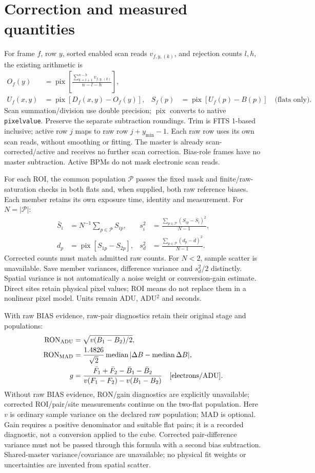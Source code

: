 \documentclass[10pt,a4paper]{article}
\begin{document}
\section*{Correction and measured quantities}
For frame $f$, row $y$, sorted enabled scan reads $v_{f,y,(k)}$, and rejection
counts $l,h$, the existing arithmetic is
\begin{align}
O_f(y)&=\operatorname{pix}\left[\frac{\sum_{k=l+1}^{n-h}v_{f,y,(k)}}{n-l-h}\right],\\
U_f(x,y)&=\operatorname{pix}[D_f(x,y)-O_f(y)], &
S_f(p)&=\operatorname{pix}[U_f(p)-B(p)]\quad\text{(flats only)}.
\end{align}
Scan summation/division use double precision; $\operatorname{pix}$ converts to
native \texttt{pixelvalue}. Preserve the separate subtraction roundings. Trim is
FITS 1-based inclusive; active row $j$ maps to raw row $j+y_{\min}-1$. Each raw row
uses its own scan reads, without smoothing or fitting. The master is already
scan-corrected/active and receives no further scan correction. Bias-role frames
have no master subtraction. Active BPMs do not mask electronic scan reads.

For each ROI, the common population $\mathcal P$ passes the fixed mask and
finite/raw-saturation checks in both flats and, when supplied, both raw reference biases. Each member
retains its own exposure time, identity and measurement. For $N=|\mathcal P|$:
\begin{align}
\bar S_i&=N^{-1}\sum_{p\in\mathcal P}S_{ip}, &
s_i^2&=\frac{\sum_{p\in\mathcal P}(S_{ip}-\bar S_i)^2}{N-1},\\
d_p&=\operatorname{pix}[S_{1p}-S_{2p}], &
s_d^2&=\frac{\sum_{p\in\mathcal P}(d_p-\bar d)^2}{N-1}.
\end{align}
Corrected counts must match admitted raw counts. For $N<2$, sample scatter is
unavailable. Save member variances, difference variance and $s_d^2/2$ distinctly.
Spatial variance is not automatically a noise weight or conversion-gain estimate.
Direct sites retain physical pixel values; ROI means do not replace them in a
nonlinear pixel model. Units remain ADU, ADU$^2$ and seconds.

With raw BIAS evidence, raw-pair diagnostics retain their original stage and populations:
\begin{align}
\mathrm{RON}_{\rm ADU}&=\sqrt{v(B_1-B_2)/2},\\
\mathrm{RON}_{\rm MAD}&=\frac{1.4826}{\sqrt2}
 \operatorname{median}|\Delta B-\operatorname{median}\Delta B|,\\
g&=\frac{\bar F_1+\bar F_2-\bar B_1-\bar B_2}
{v(F_1-F_2)-v(B_1-B_2)}\quad[\mathrm{electrons/ADU}].
\end{align}
Without raw BIAS evidence, RON/gain diagnostics are explicitly unavailable;
corrected ROI/pair/site measurements continue on the two-flat population.
Here $v$ is ordinary sample variance on the declared raw population; MAD is
optional. Gain requires a positive denominator and suitable flat pairs; it is
a recorded diagnostic, not a conversion applied to the cube. Corrected
pair-difference variance must not be passed through this formula with a second
bias subtraction. Shared-master variance/covariance are unavailable; no physical
fit weights or uncertainties are invented from spatial scatter.
\end{document}

